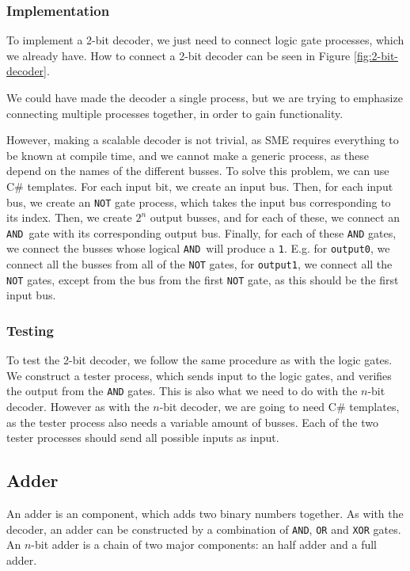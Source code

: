 \subsubsection*{Implementation}
To implement a 2-bit decoder, we just need to connect logic gate processes,
which we already have. How to connect a 2-bit decoder can be seen in Figure
\ref{fig:2-bit-decoder}.

We could have made the decoder a single process, but we are trying to emphasize
connecting multiple processes together, in order to gain functionality.

However, making a scalable decoder is not trivial, as SME requires everything
to be known at compile time, and we cannot make a generic process, as these
depend on the names of the different busses. To solve this problem, we can use
C\# templates. For each input bit, we create an input bus. Then, for each input
bus, we create an \texttt{NOT} gate process, which takes the input bus
corresponding to its index. Then, we create $2^n$ output busses, and for each
of these, we connect an \texttt{AND} gate with its corresponding output bus.
Finally, for each of these \texttt{AND} gates, we connect the busses whose
logical \texttt{AND} will produce a \texttt{1}. E.g. for \texttt{output0}, we
connect all the busses from all of the \texttt{NOT} gates, for
\texttt{output1}, we connect all the \texttt{NOT} gates, except from the bus
from the first \texttt{NOT} gate, as this should be the first input bus.

\subsubsection*{Testing}
To test the 2-bit decoder, we follow the same procedure as with the logic
gates. We construct a tester process, which sends input to the logic gates, and
verifies the output from the \texttt{AND} gates. This is also what we need to
do with the $n$-bit decoder. However as with the $n$-bit decoder, we are going
to need C\# templates, as the tester process also needs a variable amount of
busses. Each of the two tester processes should send all possible inputs as
input.

\subsection{Adder}
An adder is an component, which adds two binary numbers together. As with the
decoder, an adder can be constructed by a combination of \texttt{AND},
\texttt{OR} and \texttt{XOR} gates\cite{ref:logic}. An $n$-bit adder is a chain
of two major components: an half adder and a full adder.

